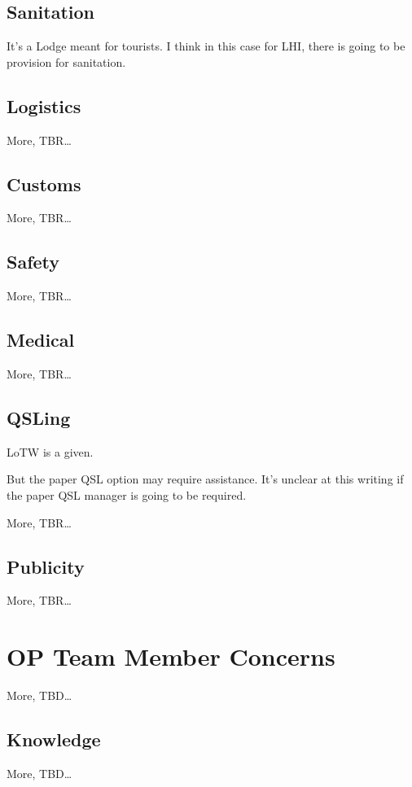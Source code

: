 \documentclass[11pt]{article}
\begin{document}
\subsection{Sanitation}

It's a Lodge meant for tourists.  I think in this case for LHI, there
is going to be provision for sanitation.

\subsection{Logistics}

More, TBR\ldots

\subsection{Customs}

More, TBR\ldots

\subsection{Safety}
More, TBR\ldots

\subsection{Medical}
More, TBR\ldots

\subsection{QSLing}

LoTW is a given.
\par
But the paper QSL option may require assistance. It's unclear at
this writing if the paper QSL manager is going to be required.

More, TBR\ldots

\subsection{Publicity}
More, TBR\ldots

\section{OP Team Member Concerns}
More, TBD\ldots

\subsection{Knowledge}
More, TBD\ldots
\end{document}
